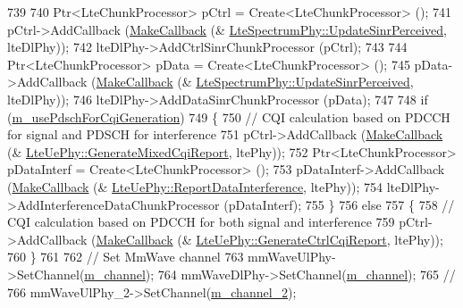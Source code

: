 \begin{DoxyCode}
739 
740         Ptr<LteChunkProcessor> pCtrl = Create<LteChunkProcessor> ();
741         pCtrl->AddCallback (\hyperlink{group__makecallbackmemptr_ga9376283685aa99d204048d6a4b7610a4}{MakeCallback} (&
      \hyperlink{classns3_1_1LteSpectrumPhy_a81e55daa6bf70765f7e7ff7cca0faed9}{LteSpectrumPhy::UpdateSinrPerceived}, lteDlPhy));
742         lteDlPhy->AddCtrlSinrChunkProcessor (pCtrl);
743 
744         Ptr<LteChunkProcessor> pData = Create<LteChunkProcessor> ();
745         pData->AddCallback (\hyperlink{group__makecallbackmemptr_ga9376283685aa99d204048d6a4b7610a4}{MakeCallback} (&
      \hyperlink{classns3_1_1LteSpectrumPhy_a81e55daa6bf70765f7e7ff7cca0faed9}{LteSpectrumPhy::UpdateSinrPerceived}, lteDlPhy));
746         lteDlPhy->AddDataSinrChunkProcessor (pData);
747 
748         \textcolor{keywordflow}{if} (\hyperlink{classns3_1_1MmWaveHelper_aa22c5cc230f1e0e6bfd280ed2b6f9635}{m\_usePdschForCqiGeneration})
749         \{
750                 \textcolor{comment}{// CQI calculation based on PDCCH for signal and PDSCH for interference}
751                 pCtrl->AddCallback (\hyperlink{group__makecallbackmemptr_ga9376283685aa99d204048d6a4b7610a4}{MakeCallback} (&
      \hyperlink{classns3_1_1LteUePhy_afdd5a3c3b8a0a7bc8996254bd693e0de}{LteUePhy::GenerateMixedCqiReport}, ltePhy));
752                 Ptr<LteChunkProcessor> pDataInterf = Create<LteChunkProcessor> ();      
753                 pDataInterf->AddCallback (\hyperlink{group__makecallbackmemptr_ga9376283685aa99d204048d6a4b7610a4}{MakeCallback} (&
      \hyperlink{classns3_1_1LteUePhy_a20cf3a136a19472fdab4ac7bd78f2c22}{LteUePhy::ReportDataInterference}, ltePhy));
754                 lteDlPhy->AddInterferenceDataChunkProcessor (pDataInterf);
755         \}
756         \textcolor{keywordflow}{else}
757         \{
758                 \textcolor{comment}{// CQI calculation based on PDCCH for both signal and interference}
759                 pCtrl->AddCallback (\hyperlink{group__makecallbackmemptr_ga9376283685aa99d204048d6a4b7610a4}{MakeCallback} (&
      \hyperlink{classns3_1_1LteUePhy_a7eb062ce376b91b78d2bcfec9119c228}{LteUePhy::GenerateCtrlCqiReport}, ltePhy));
760         \}
761 
762         \textcolor{comment}{// Set MmWave channel}
763         mmWaveUlPhy->SetChannel(\hyperlink{classns3_1_1MmWaveHelper_adac6d83bc2acef8b7dbd9fc668207d95}{m\_channel});
764         mmWaveDlPhy->SetChannel(\hyperlink{classns3_1_1MmWaveHelper_adac6d83bc2acef8b7dbd9fc668207d95}{m\_channel});
765         \textcolor{comment}{//}
766         mmWaveUlPhy\_2->SetChannel(\hyperlink{classns3_1_1MmWaveHelper_af0230ef91f1c4defe2a316f5de3ff209}{m\_channel\_2});

\end{DoxyCode}
